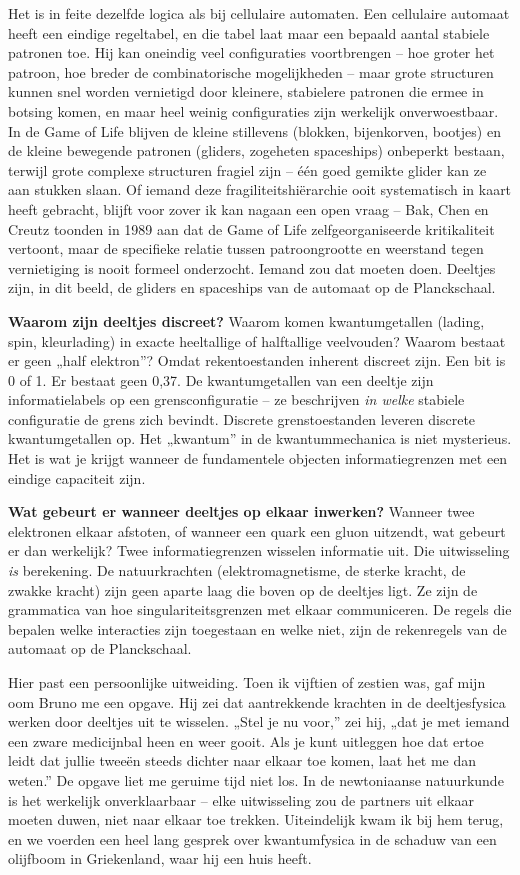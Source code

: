 \documentclass[11pt, twoside, openright]{book}
\begin{document}
Het is in feite dezelfde logica als bij cellulaire automaten. Een cellulaire automaat heeft een eindige regeltabel, en die tabel laat maar een bepaald aantal stabiele patronen toe. Hij kan oneindig veel configuraties voortbrengen -- hoe groter het patroon, hoe breder de combinatorische mogelijkheden -- maar grote structuren kunnen snel worden vernietigd door kleinere, stabielere patronen die ermee in botsing komen, en maar heel weinig configuraties zijn werkelijk onverwoestbaar. In de Game of Life blijven de kleine stillevens (blokken, bijenkorven, bootjes) en de kleine bewegende patronen (gliders, zogeheten spaceships) onbeperkt bestaan, terwijl grote complexe structuren fragiel zijn -- één goed gemikte glider kan ze aan stukken slaan. Of iemand deze fragiliteitshiërarchie ooit systematisch in kaart heeft gebracht, blijft voor zover ik kan nagaan een open vraag -- Bak, Chen en Creutz toonden in 1989 aan dat de Game of Life zelfgeorganiseerde kritikaliteit vertoont, maar de specifieke relatie tussen patroongrootte en weerstand tegen vernietiging is nooit formeel onderzocht. Iemand zou dat moeten doen. Deeltjes zijn, in dit beeld, de gliders en spaceships van de automaat op de Planckschaal.

\textbf{Waarom zijn deeltjes discreet?} Waarom komen kwantumgetallen (lading, spin, kleurlading) in exacte heeltallige of halftallige veelvouden? Waarom bestaat er geen „half elektron”? Omdat rekentoestanden inherent discreet zijn. Een bit is 0 of 1. Er bestaat geen 0,37. De kwantumgetallen van een deeltje zijn informatielabels op een grensconfiguratie -- ze beschrijven \textit{in welke} stabiele configuratie de grens zich bevindt. Discrete grenstoestanden leveren discrete kwantumgetallen op. Het „kwantum” in de kwantummechanica is niet mysterieus. Het is wat je krijgt wanneer de fundamentele objecten informatiegrenzen met een eindige capaciteit zijn.

\textbf{Wat gebeurt er wanneer deeltjes op elkaar inwerken?} Wanneer twee elektronen elkaar afstoten, of wanneer een quark een gluon uitzendt, wat gebeurt er dan werkelijk? Twee informatiegrenzen wisselen informatie uit. Die uitwisseling \textit{is} berekening. De natuurkrachten (elektromagnetisme, de sterke kracht, de zwakke kracht) zijn geen aparte laag die boven op de deeltjes ligt. Ze zijn de grammatica van hoe singulariteitsgrenzen met elkaar communiceren. De regels die bepalen welke interacties zijn toegestaan en welke niet, zijn de rekenregels van de automaat op de Planckschaal.

Hier past een persoonlijke uitweiding. Toen ik vijftien of zestien was, gaf mijn oom Bruno me een opgave. Hij zei dat aantrekkende krachten in de deeltjesfysica werken door deeltjes uit te wisselen. „Stel je nu voor,” zei hij, „dat je met iemand een zware medicijnbal heen en weer gooit. Als je kunt uitleggen hoe dat ertoe leidt dat jullie tweeën steeds dichter naar elkaar toe komen, laat het me dan weten.” De opgave liet me geruime tijd niet los. In de newtoniaanse natuurkunde is het werkelijk onverklaarbaar -- elke uitwisseling zou de partners uit elkaar moeten duwen, niet naar elkaar toe trekken. Uiteindelijk kwam ik bij hem terug, en we voerden een heel lang gesprek over kwantumfysica in de schaduw van een olijfboom in Griekenland, waar hij een huis heeft.
\end{document}
